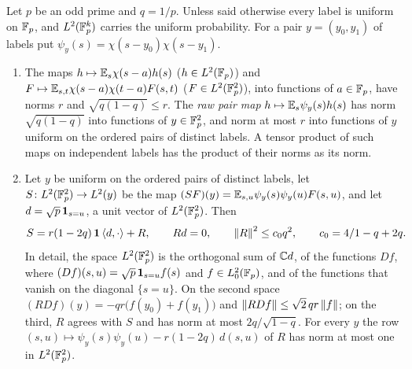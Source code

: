 \begin{corollary}\label{cor:raw-pair-maps}
Let $p$ be an odd prime and $q=1/p$. Unless said otherwise every label is
uniform on $\mathbb F_p$, and $L^2(\mathbb F_p^k)$ carries the uniform probability. For a pair
$y=(y_0,y_1)$ of labels put $\psi_y(s)=\chi(s-y_0)\chi(s-y_1)$.
\begin{enumerate}[label=\textup{(\alph*)}]
\item The maps $h\mapsto\mathbb E_s\chi(s-a)h(s)$ ($h\in L^2(\mathbb F_p)$) and $F\mapsto\mathbb E_{s,t}\chi(s-a)\chi(t-a)F(s,t)$ ($F\in L^2(\mathbb F_p^2)$), into functions of $a\in\mathbb F_p$, have norms
  $r$ and $\sqrt{q(1-q)}\le r$. The \emph{raw pair map}
  $h\mapsto\mathbb E_s\psi_y(s)h(s)$ has norm $\sqrt{q(1-q)}$ into functions of
  $y\in\mathbb F_p^2$, and norm at most $r$ into functions of $y$ uniform on the ordered
  pairs of distinct labels. A tensor product of such maps on independent labels
  has the product of their norms as its norm.
\item Let $y$ be uniform on the ordered pairs of distinct labels, let
  $S\colon L^2(\mathbb F_p^2)\to L^2(y)$ be the map
  $(SF)(y)=\mathbb E_{s,u}\psi_y(s)\psi_y(u)F(s,u)$, and let $d=\sqrt p\,\mathbf 1_{s=u}$, a
  unit vector of $L^2(\mathbb F_p^2)$. Then
  \begin{equation}\label{eq:raw-pair-split}
    S=r(1-2q)\,\mathbf 1\left\langle d,\cdot\right\rangle+R,\qquad Rd=0,\qquad\left\|R\right\|^2\le c_0q^2,\qquad
    c_0=4/1-q+2q .
  \end{equation}
  In detail, the space $L^2(\mathbb F_p^2)$ is the orthogonal sum of $\mathbb C d$, of the
  functions $Df$, where $(Df)(s,u)=\sqrt p\,\mathbf 1_{s=u}f(s)$ and
  $f\in L^2_0(\mathbb F_p)$, and of the functions that vanish on the diagonal
  $\{s=u\}$. On the second space
  $(RDf)(y)=-qr\big(f(y_0)+f(y_1)\big)$ and $\left\|RDf\right\|\le\sqrt2\,qr\left\|f\right\|$; on
  the third, $R$ agrees with $S$ and has norm at most $2q/\sqrt{1-q}$. For every
  $y$ the row $(s,u)\mapsto\psi_y(s)\psi_y(u)-r(1-2q)\,d(s,u)$ of $R$ has norm at
  most one in $L^2(\mathbb F_p^2)$.
\end{enumerate}
\end{corollary}

